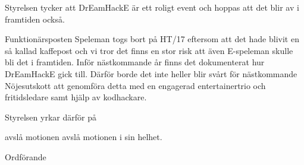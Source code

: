 \documentclass[../_main/handlingar.tex]{subfiles}
\begin{document}
\motionssvar
Styrelsen tycker att DrEamHackE är ett roligt event och hoppas att det blir av i framtiden också. 

Funktionärsposten Speleman togs bort på HT/17 eftersom att det hade blivit en så kallad kaffepost och vi tror det finns en stor risk att även E-speleman skulle bli det i framtiden. Inför nästkommande år finns det dokumenterat hur DrEamHackE gick till.  Därför borde det inte heller blir svårt för nästkommande Nöjesutskott att genomföra detta med en engagerad entertainertrio och fritidsledare samt hjälp av kodhackare. 

Styrelsen yrkar därför på

\begin{attsatser}
    \att avslå motionen avslå motionen i sin helhet.
\end{attsatser}


\begin{signatures}{1}
	\ist
	\signature{Daniel Bakic}{Ordförande}
\end{signatures}
\end{document}
